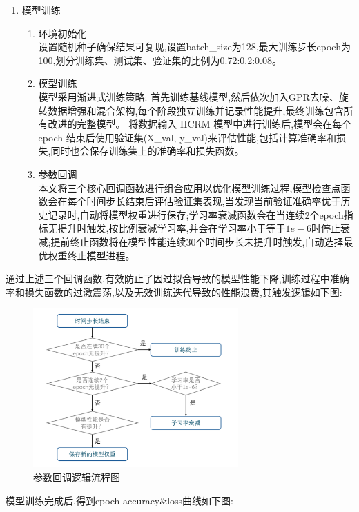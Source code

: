 \documentclass{article}
\begin{document}
\begin{CJK}{UTF8}{gbsn}
\begin{enumerate}
    \item 模型训练
    \begin{enumerate}
        \item 环境初始化 \\
        设置随机种子确保结果可复现,设置batch\_size为128,最大训练步长epoch为100,划分训练集、测试集、验证集的比例为0.72:0.2:0.08。
        \item 模型训练 \\
        模型采用渐进式训练策略: 首先训练基线模型,然后依次加入GPR去噪、旋转数据增强和混合架构,每个阶段独立训练并记录性能提升,最终训练包含所有改进的完整模型。
        将数据输入 HCRM 模型中进行训练后,模型会在每个epoch 结束后使用验证集(X\_val, y\_val)来评估性能,包括计算准确率和损失,同时也会保存训练集上的准确率和损失函数。
        \item 参数回调 \\
        本文将三个核心回调函数进行组合应用以优化模型训练过程,模型检查点函数会在每个时间步长结束后评估验证集表现,当发现当前验证准确率优于历史记录时,自动将模型权重进行保存;学习率衰减函数会在当连续2个epoch指标无提升时触发,按比例衰减学习率,并会在学习率小于等于$1e-6$时停止衰减;提前终止函数将在模型性能连续30个时间步长未提升时触发,自动选择最优权重终止模型进程。
    \end{enumerate}
\end{enumerate}
通过上述三个回调函数,有效防止了因过拟合导致的模型性能下降,训练过程中准确率和损失函数的过激震荡,以及无效训练迭代导致的性能浪费,其触发逻辑如下图:

\begin{figure}[H]
    \centering
    \includegraphics[width=0.7\textwidth]{figure/image9.png}
    \caption{参数回调逻辑流程图}
    \label{fig:callback_logic}
\end{figure}

模型训练完成后,得到epoch-accuracy\&loss曲线如下图:


\end{CJK}
\end{document}
